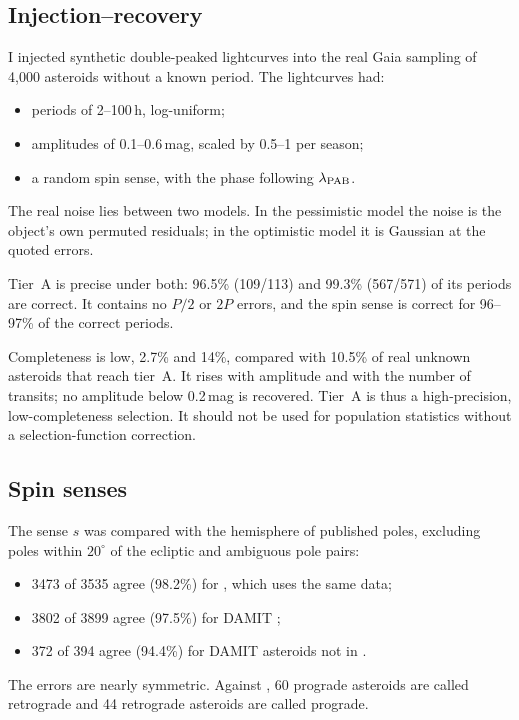 \subsection{Injection--recovery}

I injected synthetic double-peaked lightcurves into the real Gaia sampling of 4{,}000 asteroids without a
known period. The lightcurves had:
\begin{itemize}
\item periods of 2--100\,h, log-uniform;
\item amplitudes of 0.1--0.6\,mag, scaled by 0.5--1 per season;
\item a random spin sense, with the phase following $\lambda_{\rm PAB}$.
\end{itemize}

The real noise lies between two models. In the pessimistic model the noise is the object's own permuted
residuals; in the optimistic model it is Gaussian at the quoted errors.

Tier~A is precise under both: 96.5\% (109/113) and 99.3\% (567/571) of its periods are correct. It contains
no $P/2$ or $2P$ errors, and the spin sense is correct for 96--97\% of the correct periods.

Completeness is low, 2.7\% and 14\%, compared with 10.5\% of real unknown asteroids that reach tier~A. It
rises with amplitude and with the number of transits; no amplitude below 0.2\,mag is recovered. Tier~A is
thus a high-precision, low-completeness selection. It should not be used for population statistics
without a selection-function correction.

\subsection{Spin senses}

The sense $s$ was compared with the hemisphere of published poles, excluding poles within $20^\circ$ of the
ecliptic and ambiguous pole pairs:
\begin{itemize}
\item 3473 of 3535 agree (98.2\%) for \citet{Durech2023}, which uses the same data;
\item 3802 of 3899 agree (97.5\%) for DAMIT \citep{Durech2010};
\item 372 of 394 agree (94.4\%) for DAMIT asteroids not in \citet{Durech2023}.
\end{itemize}

The errors are nearly symmetric. Against \citet{Durech2023}, 60 prograde asteroids are called retrograde
and 44 retrograde asteroids are called prograde.

